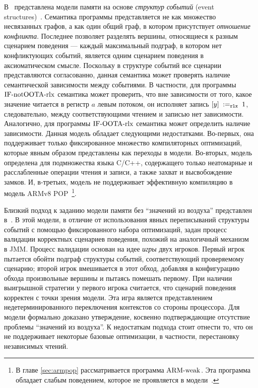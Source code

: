 В~\cite{PichonPharabod-Sewell:POPL16} представлена модели памяти на основе \emph{структур событий}
(event structures)~\cite{Winskel:AC86, Winskel:LTBT88}.
Семантика программы представляется не как множество несвязанных графов,
а как один общий граф, в котором присутствует \emph{отношение конфликта}.
Последнее позволяет разделять вершины, относящиеся к разным сценарием поведения --- каждый максимальный подграф,
в котором нет конфликтующих событий, является одним сценарием поведения в аксиоматическом смысле.
Поскольку в структуре событий все сценарии представляются согласованно,
данная семантика может проверять наличие семантической зависимости между событиями.
В частности, для программы ${\rm IF\text{-}notOOTA\text{-}rlx}$ семантика может проверить,
что вне зависимости от того, какое значение читается в регистр $a$ левым потоком,
он исполняет запись $[y] \;:=_{\mathtt{rlx}}\;1$,
следовательно, между соответствующими чтением и записью нет зависимости.
Аналогично, для программы ${\rm IF\text{-}OOTA\text{-}rlx}$ семантика может определить наличие зависимости.
Данная модель обладает следующими недостатками.
Во-первых, она поддерживает только фиксированное множество компиляторных оптимизаций,
которые явным образом представлены как переходы в модели.
Во-вторых, модель определена для подмножества языка C/C++, содержащего только
неатомарные и расслабленные операции чтения и записи, а также захват и высвобождение замков.
И, в-третьих, модель не поддерживает эффективную компиляцию в модель
ARMv8 POP~\cite{Flur-al:POPL16}\footnote{В главе \ref{sec:armpop} рассматривается программа ${\rm ARM\text{-}weak}$.
Эта программа обладает слабым поведением, которое не проявляется в модели~\cite{PichonPharabod-Sewell:POPL16}.}.

Близкий подход к заданию модели памяти без ``значений из воздуха'' представлен в~\cite{Jeffrey-Riely:LICS16}.
В этой модели, в отличие от использования явных переписываний структуры событий с помощью фиксированного
набора оптимизаций, задан процесс валидации корректных сценариев поведения, похожий на аналогичный механизм в JMM.
Процесс валидации основан на идее \emph{игры} двух игроков.
Первый игрок пытается обойти подграф структуры событий,
соответствующий проверяемому сценарию; второй игрок вмешивается в этот обход,
добавляя в конфигурацию обхода произвольные вершины и пытаясь помешать первому.
При наличии выигрышной стратегии у первого игрока считается, что сценарий поведения корректен с точки зрения
модели.
Эта игра является представлением недетерминированного переключения контекстов со стороны процессора.
Для модели формально доказано утверждение, косвенно подтверждающие отсутствие проблемы ``значений из воздуха''.
К недостаткам подхода стоит отнести то, что он не поддерживает некоторые
базовые оптимизации, в частности, перестановку независимых чтений.

